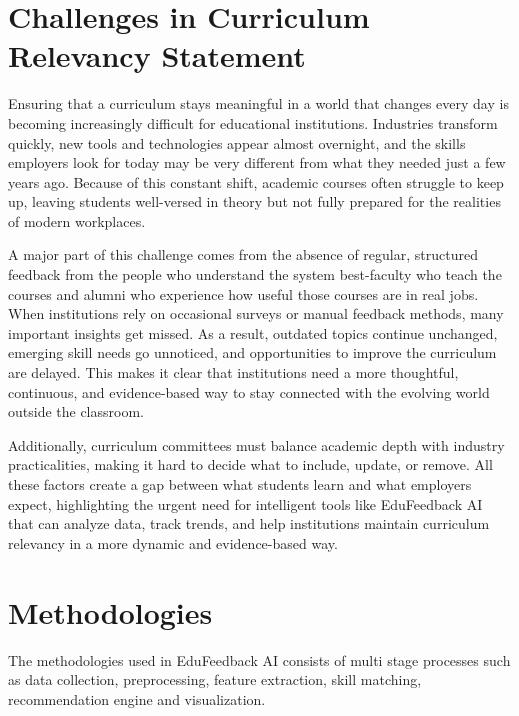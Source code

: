 \section{Challenges in Curriculum Relevancy Statement}
Ensuring that a curriculum stays meaningful in a world that changes every day is becoming increasingly difficult for educational institutions. Industries transform quickly, new tools and technologies appear almost overnight, and the skills employers look for today may be very different from what they needed just a few years ago. Because of this constant shift, academic courses often struggle to keep up, leaving students well-versed in theory but not fully prepared for the realities of modern workplaces.

A major part of this challenge comes from the absence of regular, structured feedback from the people who understand the system best-faculty who teach the courses and alumni who experience how useful those courses are in real jobs. When institutions rely on occasional surveys or manual feedback methods, many important insights get missed. As a result, outdated topics continue unchanged, emerging skill needs go unnoticed, and opportunities to improve the curriculum are delayed. This makes it clear that institutions need a more thoughtful, continuous, and evidence-based way to stay connected with the evolving world outside the classroom.

Additionally, curriculum committees must balance academic depth with industry practicalities, making it hard to decide what to include, update, or remove. All these factors create a gap between what students learn and what employers expect, highlighting the urgent need for intelligent tools like EduFeedback AI that can analyze data, track trends, and help institutions maintain curriculum relevancy in a more dynamic and evidence-based way.

\section{Methodologies}
The methodologies used in EduFeedback AI consists of multi stage processes such as data collection, preprocessing, feature extraction, skill matching, recommendation engine and visualization.

